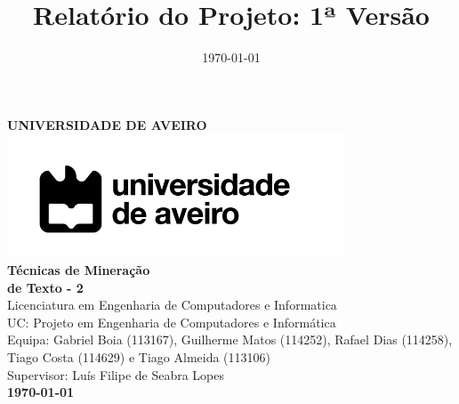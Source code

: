\documentclass[a4paper,12pt]{article}
\title{Relatório do Projeto: 1ª Versão}
\date{\today}
\begin{document}
\begin{center}
    \large\textbf{UNIVERSIDADE DE AVEIRO} \\[1.5cm]
    
    \includegraphics[width=10cm]{images/Universidade-de-Aveiro.png} \\[1.5cm]
    
    \Huge \textbf{Técnicas de Mineração\\ de Texto - 2} \\[1.5cm]


    
    \normalsize Licenciatura em Engenharia de Computadores e Informatica \\[0.5cm]
    UC: Projeto em Engenharia de Computadores e Informática \\[0.5cm]
    Equipa: Gabriel Boia (113167), Guilherme Matos (114252), Rafael Dias (114258), Tiago Costa (114629) e Tiago Almeida (113106) \\[0.5cm]
    Supervisor: Luís Filipe de Seabra Lopes \\[2cm]
    \vfill
    \textbf{\today} \\[1cm]
\end{center}
\newpage


\end{document}
